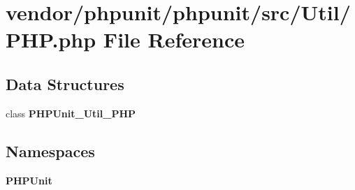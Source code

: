 \section{vendor/phpunit/phpunit/src/\+Util/\+P\+H\+P.php File Reference}
\label{phpunit_2src_2_util_2_p_h_p_8php}
\subsection*{Data Structures}
\begin{DoxyCompactItemize}
\item 
class {\bf P\+H\+P\+Unit\+\_\+\+Util\+\_\+\+P\+H\+P}
\end{DoxyCompactItemize}
\subsection*{Namespaces}
\begin{DoxyCompactItemize}
\item 
 {\bf P\+H\+P\+Unit}
\end{DoxyCompactItemize}
